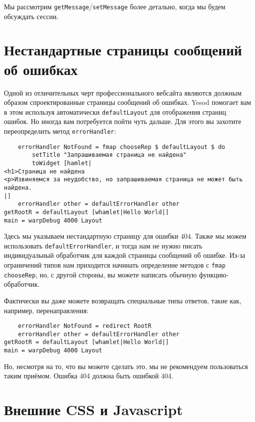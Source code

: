 Мы рассмотрим \lstinline!getMessage!/\lstinline!setMessage! более детально, когда мы будем обсуждать сессии.

\section {Нестандартные страницы сообщений об ошибках}

Одной из отличительных черт профессионального вебсайта являются должным образом спроектированные страницы сообщений об ошибках. Yesod помогает вам в этом используя автоматически \lstinline!defaultLayout! для отображения страниц ошибок. Но иногда вам потребуется пойти чуть дальше. Для этого вы захотите переопределить метод \lstinline!errorHandler!:

\begin{lstlisting}
    errorHandler NotFound = fmap chooseRep $ defaultLayout $ do
        setTitle "Запрашиваемая страница не найдена"
        toWidget [hamlet|
<h1>Страница не найдена
<p>Извиняемся за неудобство, но запрашиваемая страница не может быть найдена.
|]
    errorHandler other = defaultErrorHandler other
getRootR = defaultLayout [whamlet|Hello World|]
main = warpDebug 4000 Layout
\end{lstlisting}

Здесь мы указываем нестандартную страницу для ошибки 404. Также мы можем использовать \lstinline!defaultErrorHandler!, и тогда нам не нужно писать индивидуальный обработчик для каждой страницы сообщений об ошибке. Из-за ограничений типов нам приходится начинать определение методов с \lstinline!fmap chooseRep!, но, с другой стороны, вы можете написать обычную функцию-обработчик.

Фактически вы даже можете возвращать специальные типы ответов, такие как, например, перенаправления:

\begin{lstlisting}
    errorHandler NotFound = redirect RootR
    errorHandler other = defaultErrorHandler other
getRootR = defaultLayout [whamlet|Hello World|]
main = warpDebug 4000 Layout
\end{lstlisting}

\begin{remark}
Но, несмотря на то, что вы можете сделать это, мы не рекомендуем пользоваться таким приёмом. Ошибка 404 должна быть ошибкой 404.
\end{remark}

\section {Внешние CSS и Javascript}

